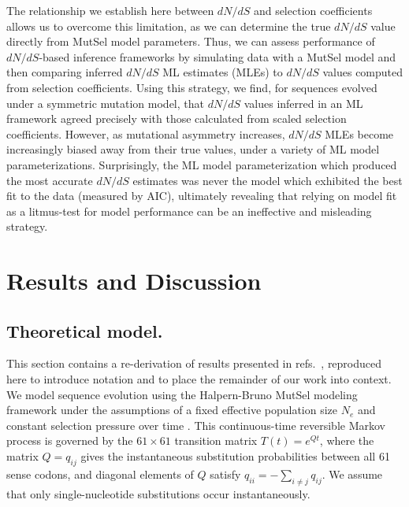 \documentclass[11pt]{article}
\begin{document}
The relationship we establish here between $dN/dS$ and selection coefficients allows us to overcome this limitation, as we can determine the true $dN/dS$ value directly from MutSel model parameters. Thus, we can assess performance of $dN/dS$-based inference frameworks by simulating data with a MutSel model and then comparing inferred $dN/dS$ ML estimates (MLEs) to $dN/dS$ values computed from selection coefficients. Using this strategy, we find, for sequences evolved under a symmetric mutation model, that $dN/dS$ values inferred in an ML framework agreed precisely with those calculated from scaled selection coefficients. However, as mutational asymmetry increases, $dN/dS$ MLEs become increasingly biased away from their true values, under a variety of ML model parameterizations. Surprisingly, the ML model parameterization which produced the most accurate $dN/dS$ estimates was never the model which exhibited the best fit to the data (measured by AIC), ultimately revealing that relying on model fit as a litmus-test for model performance can be an ineffective and misleading strategy. 

		
\section*{Results and Discussion}
		
		
\subsection*{Theoretical model.}
This section contains a re-derivation of results presented in refs.\ \citep{HalpernBruno1998,YangNielsen2008}, reproduced here to introduce notation and to place the remainder of our work into context. We model sequence evolution using the Halpern-Bruno MutSel modeling framework under the assumptions of a fixed effective population size $N_e$ and constant selection pressure over time \citep{HalpernBruno1998,YangNielsen2008,Tamurietal2012,Thorne2012}.  This continuous-time reversible Markov process is governed by the $61 \times 61$ transition matrix $T(t) = e^{Qt}$, where the matrix $Q = q_{ij}$ gives the instantaneous substitution probabilities between all 61 sense codons, and diagonal elements of $Q$ satisfy $q_{ii} = -\sum_{i \neq j} q_{ij}$. We assume that only single-nucleotide substitutions occur instantaneously. 
\end{document}
